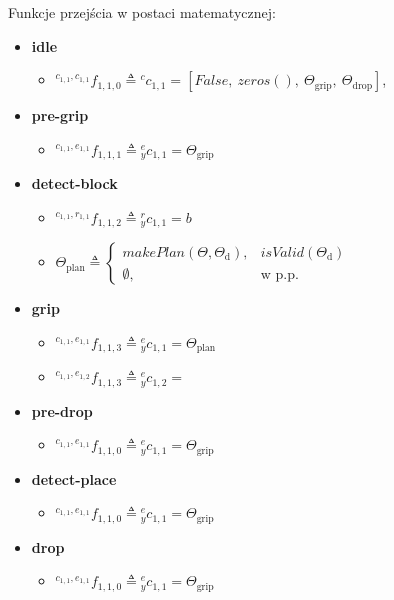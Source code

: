 Funkcje przejścia w postaci matematycznej:
\begin{itemize}
    \item \textbf{idle} \begin{itemize}
        \item ${}^{c_{1,1}, c_{1,1}}f_{1,1,0} \triangleq {}^{c}c_{1,1} = [False,~zeros(),~\Theta_{\mathrm{grip}},~\Theta_{\mathrm{drop}}]$,
    \end{itemize} 

    \item \textbf{pre-grip} \begin{itemize}
        \item ${}^{c_{1,1}, e_{1,1}}f_{1,1,1} \triangleq {}^{e}_{y}c_{1,1} = \Theta_{\mathrm{grip}}$
    \end{itemize}

    \item \textbf{detect-block} \begin{itemize}
        \item ${}^{c_{1,1}, r_{1,1}}f_{1,1,2} \triangleq {}^{r}_{y}c_{1,1} = b$
        \item $\Theta_{\mathrm{plan}} \triangleq 
            \begin{cases}
			    makePlan(\Theta, \Theta_{\mathrm{d}}), & isValid(\Theta_{\mathrm{d}})\\
                \emptyset, & \text{w p.p.}
		    \end{cases}$
    \end{itemize}
    
    \item \textbf{grip} \begin{itemize}
        \item ${}^{c_{1,1}, e_{1,1}}f_{1,1,3} \triangleq {}^{e}_{y}c_{1,1} = \Theta_{\mathrm{plan}}$
        \item ${}^{c_{1,1}, e_{1,2}}f_{1,1,3} \triangleq {}^{e}_{y}c_{1,2} = $
    \end{itemize}


    \item \textbf{pre-drop} \begin{itemize}
        \item ${}^{c_{1,1}, e_{1,1}}f_{1,1,0} \triangleq {}^{e}_{y}c_{1,1} = \Theta_{\mathrm{grip}}$
    \end{itemize}
    \item \textbf{detect-place} \begin{itemize}
        \item ${}^{c_{1,1}, e_{1,1}}f_{1,1,0} \triangleq {}^{e}_{y}c_{1,1} = \Theta_{\mathrm{grip}}$
    \end{itemize}
    \item \textbf{drop} \begin{itemize}
        \item ${}^{c_{1,1}, e_{1,1}}f_{1,1,0} \triangleq {}^{e}_{y}c_{1,1} = \Theta_{\mathrm{grip}}$
    \end{itemize}
\end{itemize}
